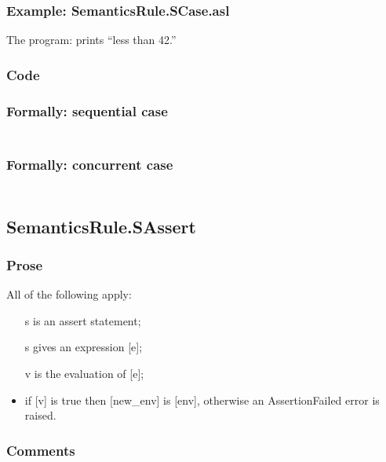 \documentclass{book}
\begin{document}
    \subsubsection{Example: SemanticsRule.SCase.asl}
    The program:
    prints ``less than 42.''

  \subsubsection{Code}

  \subsubsection{Formally: sequential case}
  \begin{align}
  \end{align} 

  \subsubsection{Formally: concurrent case}
  \begin{align}
  \end{align} 

\subsection{SemanticsRule.SAssert \label{sec:SemanticsRule.SAssert}}

    \subsubsection{Prose}
    All of the following apply:
    \begin{itemize}
    \item [s] is an assert statement;
    \item [s] gives an expression [e];
    \item [v] is the evaluation of [e];
    \item if [v] is true then [new\_env] is [env], otherwise an AssertionFailed
      error is raised.
    \end{itemize}

    \subsubsection{Comments}
\end{document}
